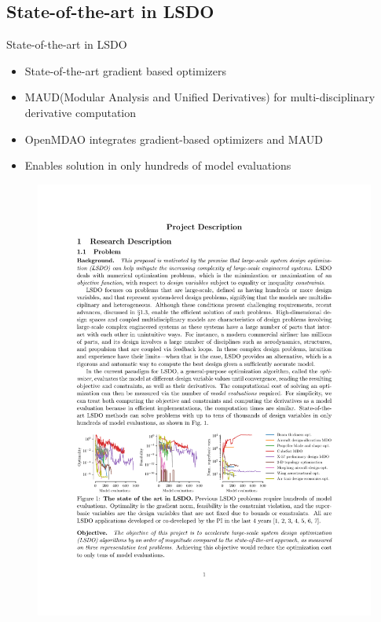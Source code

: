 \documentclass{beamer}
\begin{document}
\subsection{State-of-the-art in LSDO}
  \begin{frame}{State-of-the-art in LSDO}
  \vspace{-10mm}
  \begin{itemize}
    \item State-of-the-art gradient based optimizers
    \item MAUD(Modular Analysis and Unified Derivatives) for multi-disciplinary derivative computation
    \item OpenMDAO integrates gradient-based optimizers and MAUD
    \item Enables solution in only hundreds of model evaluations
  \end{itemize}
  \vspace{1cm}
  \begin{figure}[ht]
    \centering
    \vspace{-10mm}
    \includegraphics[width=\linewidth]{Figures/Figure1}
    \vspace{-5mm}
    \label{fig:model_evals}
  \end{figure}
  \end{frame}
\end{document}
